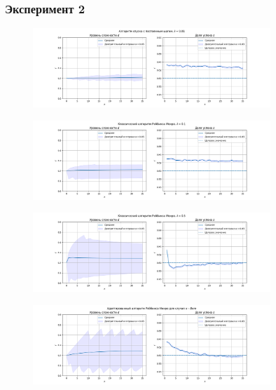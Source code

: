 \documentclass{mipt-thesis-bs}
\begin{document}
\subsubsection{Эксперимент 2}
\begin{figure}[h!]
    \centering
    \includegraphics[width=0.8\textwidth]{assets/2/fixed.png}
    \label{exp2:fixed}
\end{figure}
\begin{figure}[h!]
    \centering
    \includegraphics[width=0.8\textwidth]{assets/2/lambda_0.1.png}
    \label{exp2:lambda_0.1}
\end{figure}
\begin{figure}[h!]
    \centering
    \includegraphics[width=0.8\textwidth]{assets/2/lambda_0.5.png}
    \label{exp2:lambda_0.5}
\end{figure}
\begin{figure}[h!]
    \centering
    \includegraphics[width=0.8\textwidth]{assets/2/adaptive.png}
    \label{exp2:adaptive}
\end{figure}
\pagebreak
\end{document}
